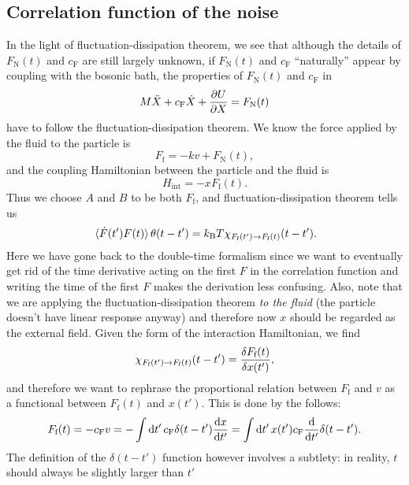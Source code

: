 \documentclass[hyperref, a4paper]{article}
\newcommand*{\kB}{k_{\text{B}}}
\newcommand{\cf}{c_{\text{F}}}
\newcommand{\fn}{F_{\text{N}}}
\newcommand{\ff}{F_{\text{f}}}
\begin{document}
\subsection{Correlation function of the noise}

In the light of fluctuation-dissipation theorem, 
we see that although the details of $\fn(t)$ and $\cf$
are still largely unknown,
if $\fn(t)$ and $\cf$ ``naturally'' appear 
by coupling with the bosonic bath, 
the properties of $\fn(t)$ and $\cf$ in 
\begin{equation}
    M \ddot{X} + \cf \dot{X} + \pdv{U}{X} = \fn(t)
\end{equation}
have to follow the fluctuation-dissipation theorem.
We know the force applied by the fluid to the particle is 
\begin{equation}
    \ff = - k v + \fn(t),
\end{equation} 
and the coupling Hamiltonian between the particle and the fluid is 
\begin{equation}
    H_{\text{int}} = - x \ff(t).
\end{equation}
Thus we choose $A$ and $B$ to be both $\ff$,
and fluctuation-dissipation theorem tells us 
\begin{equation}
    \expval*{\dot{F}(t') F(t)} \theta(t - t') = \kB T \chi_{\ff(t') \to \ff(t)} (t - t').
\end{equation}
Here we have gone back to the double-time formalism 
since we want to eventually get rid of the time derivative acting 
on the first $F$ in the correlation function 
and writing the time of the first $F$ 
makes the derivation less confusing. 
Also, note that we are applying the fluctuation-dissipation theorem 
\emph{to the fluid} (the particle doesn't have linear response anyway)
and therefore now $x$ should be regarded as the external field.
Given the form of the interaction Hamiltonian, 
we find 
\begin{equation}
    \chi_{\ff(t') \to \ff(t)} (t - t') = 
    \fdv{\ff(t)}{x(t')} ,
\end{equation}
and therefore we want to rephrase the proportional relation 
between $\ff$ and $v$
as a functional between $\ff(t)$ and $x(t')$.
This is done by the follows:
\begin{equation}
    \ff(t) = - \cf v = - \int \dd{t'} \cf \delta(t - t') \dv{x}{t'}
    = \int \dd{t'} x(t') \cf \dv{t'} \delta(t - t') .
\end{equation}
The definition of the $\delta(t - t')$ function however involves a subtlety:
in reality, $t$ should always be slightly larger than $t'$ 
\end{document}
